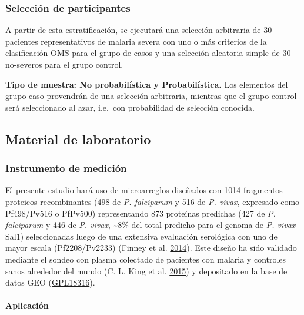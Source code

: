 \documentclass[a4paper]{article}
\let\oldparagraph\paragraph
\renewcommand{\paragraph}[1]{\oldparagraph{#1}\mbox{}}
\begin{document}
\subsubsection{Selección de
participantes}\label{seleccion-de-participantes}

A partir de esta estratificación, se ejecutará una selección arbitraria
de 30 pacientes representativos de malaria severa con uno o más
criterios de la clasificación OMS para el grupo de casos y una selección
aleatoria simple de 30 no-severos para el grupo control.

\textbf{Tipo de muestra: No probabilística y Probabilística.} Los
elementos del grupo caso provendrán de una selección arbitraria,
mientras que el grupo control será seleccionado al azar, i.e.~con
probabilidad de selección conocida.

\subsection{Material de laboratorio}\label{material-de-laboratorio}

\subsubsection{Instrumento de medición}\label{instrumento-de-medicion}

El presente estudio hará uso de microarreglos diseñados con 1014
fragmentos proteicos recombinantes (498 de \emph{P. falciparum} y 516 de
\emph{P. vivax}, expresado como Pf498/Pv516 o PfPv500) representando 873
proteínas predichas (427 de \emph{P. falciparum} y 446 de \emph{P.
vivax}, \textasciitilde{}8\% del total predicho para el genoma de
\emph{P. vivax} Sal1) seleccionadas luego de una extensiva evaluación
serológica con uno de mayor escala (Pf2208/Pv2233) (Finney et al.
\protect\hyperlink{ref-Finney2014}{2014}). Este diseño ha sido validado
mediante el sondeo con plasma colectado de pacientes con malaria y
controles sanos alrededor del mundo (C. L. King et al.
\protect\hyperlink{ref-King2015FOC}{2015}) y depositado en la base de
datos GEO
(\href{https://www.ncbi.nlm.nih.gov/geo/query/acc.cgi?acc=GPL18316}{GPL18316}).

\paragraph{Aplicación}\label{aplicacion}
\end{document}

